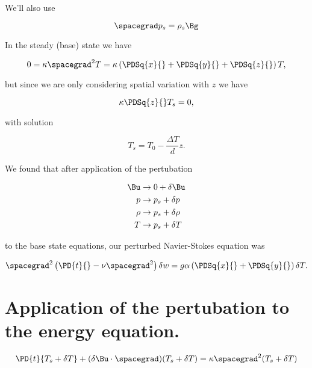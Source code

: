 We'll also use 

\begin{equation}\label{eqn:continuumL22:70}
\spacegrad p_s = \rho_s \Bg
\end{equation}

In the steady (base) state we have

\begin{equation}\label{eqn:continuumL22:90}
0 = \kappa \spacegrad^2 T = 
\kappa \left( 
\PDSq{x}{}
+\PDSq{y}{}
+\PDSq{z}{} \right) T,
\end{equation}

but since we are only considering spatial variation with $z$ we have

\begin{equation}\label{eqn:continuumL22:110}
\kappa \PDSq{z}{} T_s = 0,
\end{equation}

with solution

\begin{equation}\label{eqn:continuumL22:130}
T_s = T_0 - \frac{\Delta T}{d} z.
\end{equation}

We found that after application of the pertubation

\begin{align}\label{eqn:continuumL22:150}
\Bu &\rightarrow 0 + \delta \Bu \\
p &\rightarrow p_s + \delta p \\
\rho &\rightarrow p_s + \delta \rho \\
T &\rightarrow p_s + \delta T
\end{align}

to the base state equations, our perturbed Navier-Stokes equation was

\begin{equation}\label{eqn:continuumL22:170}
\spacegrad^2 \left( \PD{t}{} - \nu \spacegrad^2 \right) \delta w = g \alpha 
\left(
\PDSq{x}{}
+\PDSq{y}{}
\right)
\delta T.
\end{equation}

\section{Application of the pertubation to the energy equation.}

\begin{equation}\label{eqn:continuumL22:190}
\PD{t}{T_s + \delta T} + (\delta \Bu \cdot \spacegrad) (T_s + \delta T) = \kappa \spacegrad^2 (T_s + \delta T)
\end{equation}

